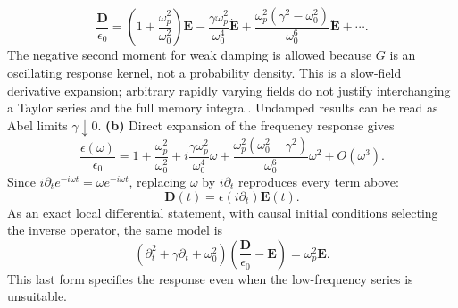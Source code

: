 \[
\boxed{\frac{\mathbf D}{\epsilon_0}
=\left(1+\frac{\omega_p^2}{\omega_0^2}\right)\mathbf E
-\frac{\gamma\omega_p^2}{\omega_0^4}\dot{\mathbf E}
+\frac{\omega_p^2(\gamma^2-\omega_0^2)}{\omega_0^6}
 \ddot{\mathbf E}+\cdots.}
\]
The negative second moment for weak damping is allowed because
$G$ is an oscillating response kernel, not a probability density.
This is a slow-field derivative expansion; arbitrary rapidly varying
fields do not justify interchanging a Taylor series and the full
memory integral. Undamped results can be read as Abel limits
$\gamma\downarrow0$.
\textbf{(b)} Direct expansion of the frequency response gives
\[
\frac{\epsilon(\omega)}{\epsilon_0}
=1+\frac{\omega_p^2}{\omega_0^2}
+i\frac{\gamma\omega_p^2}{\omega_0^4}\omega
+\frac{\omega_p^2(\omega_0^2-\gamma^2)}{\omega_0^6}\omega^2
+O(\omega^3).
\]
Since $i\partial_t e^{-i\omega t}=\omega e^{-i\omega t}$,
replacing $\omega$ by $i\partial_t$ reproduces every term above:
\[
\boxed{\mathbf D(t)=\epsilon(i\partial_t)\mathbf E(t).}
\]
As an exact local differential statement, with causal initial
conditions selecting the inverse operator, the same model is
\[
(\partial_t^2+\gamma\partial_t+\omega_0^2)
\left(\frac{\mathbf D}{\epsilon_0}-\mathbf E\right)
=\omega_p^2\mathbf E.
\]
This last form specifies the response even when the low-frequency
series is unsuitable.

